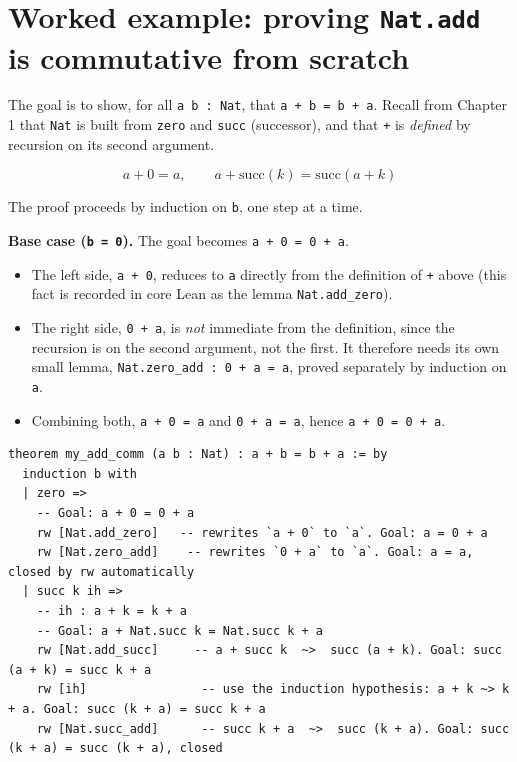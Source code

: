 \section{\texorpdfstring{Worked example: proving \texttt{Nat.add} is commutative from scratch}{Worked example: proving Nat.add is commutative from scratch}}\label{sec:05-tactics:05-worked-example:1}

The goal is to show, for all \texttt{a b : Nat}, that \texttt{a + b = b + a}. Recall from Chapter 1 that \texttt{Nat} is built from \texttt{zero} and \texttt{succ} (successor), and that \texttt{+} is \emph{defined} by recursion on its second argument.

\[
a + 0 = a, \qquad a + \mathrm{succ}(k) = \mathrm{succ}(a + k)
\]

The proof proceeds by induction on \texttt{b}, one step at a time.

\textbf{Base case (\texttt{b = 0}).} The goal becomes \texttt{a + 0 = 0 + a}.

\begin{itemize}
\tightlist
\item
  The left side, \texttt{a + 0}, reduces to \texttt{a} directly from the definition of \texttt{+} above (this fact is recorded in core Lean as the lemma \texttt{Nat.add\_\allowbreak{}zero}).
\item
  The right side, \texttt{0 + a}, is \emph{not} immediate from the definition, since the recursion is on the second argument, not the first. It therefore needs its own small lemma, \texttt{Nat.zero\_\allowbreak{}add : 0 + a = a}, proved separately by induction on \texttt{a}.
\item
  Combining both, \texttt{a + 0 = a} and \texttt{0 + a = a}, hence \texttt{a + 0 = 0 + a}.
\end{itemize}

\begin{lstlisting}
theorem my_add_comm (a b : Nat) : a + b = b + a := by
  induction b with
  | zero =>
    -- Goal: a + 0 = 0 + a
    rw [Nat.add_zero]   -- rewrites `a + 0` to `a`. Goal: a = 0 + a
    rw [Nat.zero_add]    -- rewrites `0 + a` to `a`. Goal: a = a, closed by rw automatically
  | succ k ih =>
    -- ih : a + k = k + a
    -- Goal: a + Nat.succ k = Nat.succ k + a
    rw [Nat.add_succ]     -- a + succ k  ~>  succ (a + k). Goal: succ (a + k) = succ k + a
    rw [ih]                -- use the induction hypothesis: a + k ~> k + a. Goal: succ (k + a) = succ k + a
    rw [Nat.succ_add]      -- succ k + a  ~>  succ (k + a). Goal: succ (k + a) = succ (k + a), closed
\end{lstlisting}

